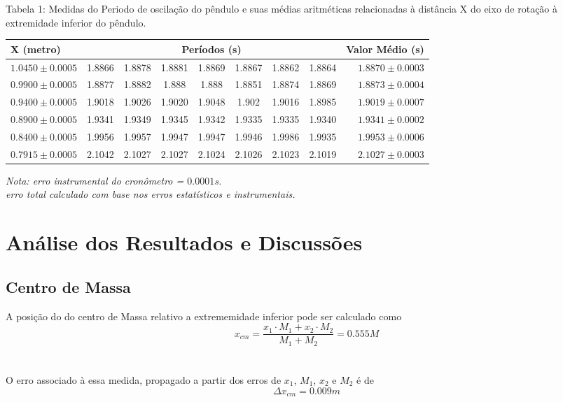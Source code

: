 \documentclass[12pt,a4paper]{article}
\begin{document}
\begin{table}[!htbp]

{Tabela 1: Medidas do Periodo de oscilação do pêndulo e suas médias aritméticas relacionadas à distância X do eixo de rotação à extremidade inferior do pêndulo.}\\[10pt] 	%

\def\arraystretch{1.5}
\begin{tabular}{|l| c c c c c c c|r|}
\hline 
X (metro) & \multicolumn{7}{c|}{Períodos (s)} & {Valor Médio (s)} \\ 
\hline
$1.0450\pm0.0005$ & 1.8866 & 1.8878 & 1.8881 & 1.8869 & 1.8867 & 1.8862 & 1.8864 & $1.8870 \pm 0.0003 $ \\
\hline
$0.9900\pm0.0005$ & 1.8877 & 1.8882 & 1.888 & 1.888 & 1.8851 & 1.8874 & 1.8869 & $1.8873 \pm 0.0004 $\\
\hline
$0.9400\pm0.0005$ & 1.9018 & 1.9026 & 1.9020 & 1.9048 & 1.902 & 1.9016 & 1.8985 & $1.9019 \pm 0.0007$\\
\hline
$0.8900\pm0.0005$ & 1.9341 & 1.9349 & 1.9345 & 1.9342 & 1.9335 & 1.9335 & 1.9340 & $1.9341 \pm 0.0002$\\
\hline
$0.8400\pm0.0005$ & 1.9956 & 1.9957 & 1.9947 & 1.9947 & 1.9946 & 1.9986 & 1.9935 & $1.9953 \pm 0.0006$\\
\hline
$0.7915\pm0.0005$ & 2.1042 & 2.1027 & 2.1027 & 2.1024 & 2.1026 & 2.1023 & 2.1019 & $2.1027 \pm 0.0003 $\\
\hline
\end{tabular}

\emph{Nota: erro instrumental do cronômetro = $0.0001$s.\\ erro total calculado com base nos erros estatísticos e instrumentais.}
\end{table}


\newpage

\section{Análise dos Resultados e Discussões}
\subsection{Centro de Massa}
A posição do do centro de Massa relativo a extrememidade inferior pode ser calculado como\\
$$ x_{cm} = \frac{x_1 \cdot M_1 + x_2 \cdot M_2}{M_1 + M_2} = 0.555 M $$\\ \\
O erro associado à essa medida, propagado a partir dos erros de $x_1$, $M_1$, $x_2$ e $M_2$ é de 
$$ \Delta x_{cm} =  0.009 m $$
\end{document}
